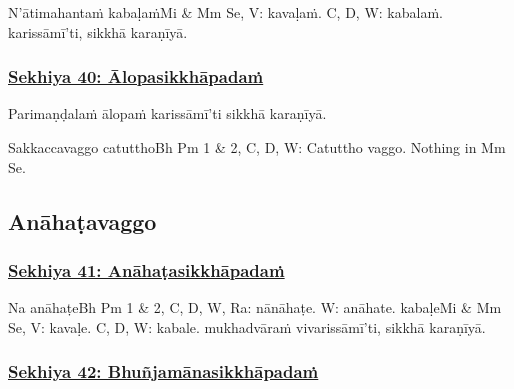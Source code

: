 N'ātimahantaṁ kabaḷaṁ\makeatletter\hyperlink{endnote-appendix}\makeatother Mi & Mm Se, V: kavaḷaṁ. C, D, W: kabalaṁ. karissāmī'ti, sikkhā karaṇīyā.



\subsubsection*{\hyperref[training40]{Sekhiya 40: Ālopasikkhāpadaṁ}}
\label{sekh40}

Parimaṇḍalaṁ ālopaṁ karissāmī'ti sikkhā karaṇīyā.

\begin{center}
	Sakkaccavaggo catuttho\makeatletter\hyperlink{endnote-appendix}\makeatother Bh Pm 1 & 2, C, D, W: Catuttho vaggo. Nothing in Mm Se.
\end{center}



\subsection{Anāhaṭavaggo}

\subsubsection*{\hyperref[training41]{Sekhiya 41: Anāhaṭasikkhāpadaṁ}}
\label{sekh41}

Na anāhaṭe\makeatletter\hyperlink{endnote-appendix}\makeatother Bh Pm 1 & 2, C, D, W, Ra: nānāhaṭe. W: anāhate. kabaḷe\makeatletter\hyperlink{endnote-appendix}\makeatother Mi & Mm Se, V: kavaḷe. C, D, W: kabale. mukhadvāraṁ vivarissāmī'ti, sikkhā karaṇīyā.



\subsubsection*{\hyperref[training42]{Sekhiya 42: Bhuñjamānasikkhāpadaṁ}}
\label{sekh42}


